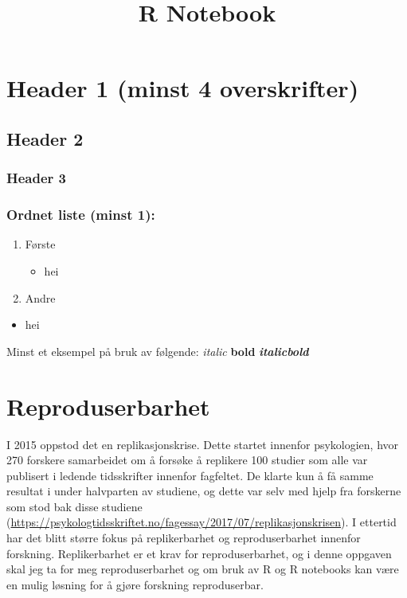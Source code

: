 \documentclass[
]{article}
\title{R Notebook}
\author{}
\date{\vspace{-2.5em}}
\providecommand{\tightlist}{%
  \setlength{\itemsep}{0pt}\setlength{\parskip}{0pt}}
\begin{document}
\maketitle

\hypertarget{header-1-minst-4-overskrifter}{%
\section{Header 1 (minst 4
overskrifter)}\label{header-1-minst-4-overskrifter}}

\hypertarget{header-2}{%
\subsection{Header 2}\label{header-2}}

\hypertarget{header-3}{%
\subsubsection{Header 3}\label{header-3}}

\hypertarget{ordnet-liste-minst-1}{%
\subsubsection{Ordnet liste (minst 1):}\label{ordnet-liste-minst-1}}

\begin{enumerate}
\def\labelenumi{\arabic{enumi}.}
\item
  Første

  \begin{itemize}
  \tightlist
  \item
    hei
  \end{itemize}
\item
  Andre
\end{enumerate}

\begin{itemize}
\tightlist
\item
  hei
\end{itemize}

Minst et eksempel på bruk av følgende: \emph{italic} \textbf{bold}
\textbf{\emph{italicbold}}

\hypertarget{reproduserbarhet}{%
\section{Reproduserbarhet}\label{reproduserbarhet}}

I 2015 oppstod det en replikasjonskrise. Dette startet innenfor
psykologien, hvor 270 forskere samarbeidet om å forsøke å replikere 100
studier som alle var publisert i ledende tidsskrifter innenfor
fagfeltet. De klarte kun å få samme resultat i under halvparten av
studiene, og dette var selv med hjelp fra forskerne som stod bak disse
studiene
(\url{https://psykologtidsskriftet.no/fagessay/2017/07/replikasjonskrisen}).
I ettertid har det blitt større fokus på replikerbarhet og
reproduserbarhet innenfor forskning. Replikerbarhet er et krav for
reproduserbarhet, og i denne oppgaven skal jeg ta for meg
reproduserbarhet og om bruk av R og R notebooks kan være en mulig
løsning for å gjøre forskning reproduserbar.
\end{document}
